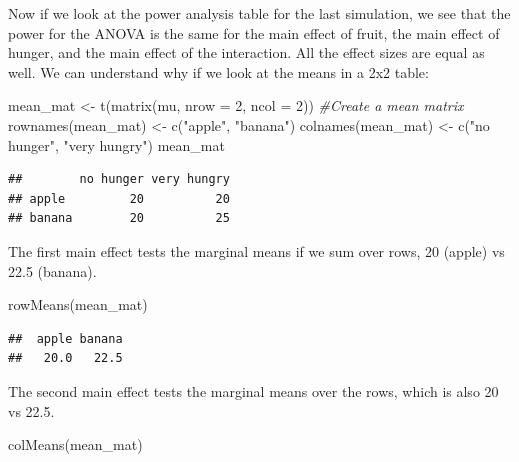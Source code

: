 \documentclass[
]{book}
\newenvironment{Shaded}{\begin{snugshade}}{\end{snugshade}}
\newcommand{\AttributeTok}[1]{\textcolor[rgb]{0.77,0.63,0.00}{#1}}
\newcommand{\CommentTok}[1]{\textcolor[rgb]{0.56,0.35,0.01}{\textit{#1}}}
\newcommand{\DecValTok}[1]{\textcolor[rgb]{0.00,0.00,0.81}{#1}}
\newcommand{\FunctionTok}[1]{\textcolor[rgb]{0.00,0.00,0.00}{#1}}
\newcommand{\NormalTok}[1]{#1}
\newcommand{\OtherTok}[1]{\textcolor[rgb]{0.56,0.35,0.01}{#1}}
\newcommand{\StringTok}[1]{\textcolor[rgb]{0.31,0.60,0.02}{#1}}
\begin{document}
Now if we look at the power analysis table for the last simulation, we see that the power for the ANOVA is the same for the main effect of fruit, the main effect of hunger, and the main effect of the interaction. All the effect sizes are equal as well. We can understand why if we look at the means in a 2x2 table:

\begin{Shaded}
\begin{Highlighting}[]
\NormalTok{mean\_mat }\OtherTok{\textless{}{-}} \FunctionTok{t}\NormalTok{(}\FunctionTok{matrix}\NormalTok{(mu, }
                     \AttributeTok{nrow =} \DecValTok{2}\NormalTok{,}
                     \AttributeTok{ncol =} \DecValTok{2}\NormalTok{)) }\CommentTok{\#Create a mean matrix}
\FunctionTok{rownames}\NormalTok{(mean\_mat) }\OtherTok{\textless{}{-}} \FunctionTok{c}\NormalTok{(}\StringTok{"apple"}\NormalTok{, }\StringTok{"banana"}\NormalTok{)}
\FunctionTok{colnames}\NormalTok{(mean\_mat) }\OtherTok{\textless{}{-}} \FunctionTok{c}\NormalTok{(}\StringTok{"no hunger"}\NormalTok{, }\StringTok{"very hungry"}\NormalTok{)}
\NormalTok{mean\_mat}
\end{Highlighting}
\end{Shaded}

\begin{verbatim}
##        no hunger very hungry
## apple         20          20
## banana        20          25
\end{verbatim}

The first main effect tests the marginal means if we sum over rows, 20 (apple) vs 22.5 (banana).

\begin{Shaded}
\begin{Highlighting}[]
\FunctionTok{rowMeans}\NormalTok{(mean\_mat)}
\end{Highlighting}
\end{Shaded}

\begin{verbatim}
##  apple banana 
##   20.0   22.5
\end{verbatim}

The second main effect tests the marginal means over the rows, which is also 20 vs 22.5.

\begin{Shaded}
\begin{Highlighting}[]
\FunctionTok{colMeans}\NormalTok{(mean\_mat)}
\end{Highlighting}
\end{Shaded}
\end{document}
